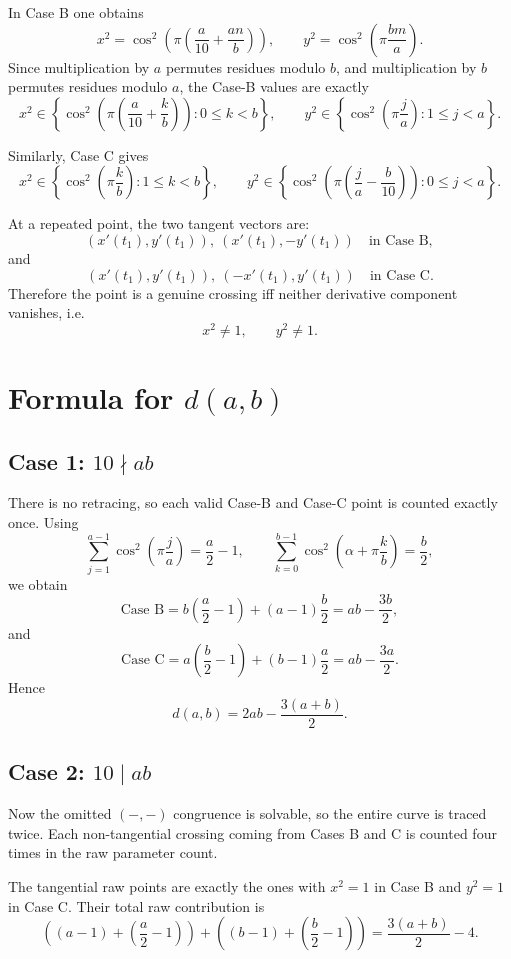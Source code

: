 \documentclass[11pt]{article}
\begin{document}
In Case B one obtains
\[
x^2=\cos^2\!\left(\pi\left(\frac{a}{10}+\frac{an}{b}\right)\right),
\qquad
y^2=\cos^2\!\left(\pi\frac{bm}{a}\right).
\]
Since multiplication by $a$ permutes residues modulo $b$, and multiplication by $b$ permutes residues modulo $a$, the Case-B values are exactly
\[
x^2\in \left\{\cos^2\!\left(\pi\left(\frac{a}{10}+\frac{k}{b}\right)\right):0\le k<b\right\},
\qquad
y^2\in \left\{\cos^2\!\left(\pi\frac{j}{a}\right):1\le j<a\right\}.
\]

Similarly, Case C gives
\[
x^2\in \left\{\cos^2\!\left(\pi\frac{k}{b}\right):1\le k<b\right\},
\qquad
y^2\in \left\{\cos^2\!\left(\pi\left(\frac{j}{a}-\frac{b}{10}\right)\right):0\le j<a\right\}.
\]

At a repeated point, the two tangent vectors are:
\[
(x'(t_1),y'(t_1)),\ (x'(t_1),-y'(t_1)) \quad\text{in Case B},
\]
and
\[
(x'(t_1),y'(t_1)),\ (-x'(t_1),y'(t_1)) \quad\text{in Case C}.
\]
Therefore the point is a genuine crossing iff neither derivative component vanishes, i.e.
\[
x^2\ne 1,\qquad y^2\ne 1.
\]

\section{Formula for \texorpdfstring{$d(a,b)$}{d(a,b)}}

\subsection*{Case 1: $10\nmid ab$}

There is no retracing, so each valid Case-B and Case-C point is counted exactly once.
Using
\[
\sum_{j=1}^{a-1}\cos^2\!\left(\pi\frac{j}{a}\right)=\frac{a}{2}-1,
\qquad
\sum_{k=0}^{b-1}\cos^2\!\left(\alpha+\pi\frac{k}{b}\right)=\frac{b}{2},
\]
we obtain
\[
\text{Case B}=b\left(\frac{a}{2}-1\right)+(a-1)\frac{b}{2}=ab-\frac{3b}{2},
\]
and
\[
\text{Case C}=a\left(\frac{b}{2}-1\right)+(b-1)\frac{a}{2}=ab-\frac{3a}{2}.
\]
Hence
\[
d(a,b)=2ab-\frac{3(a+b)}{2}.
\]

\subsection*{Case 2: $10\mid ab$}

Now the omitted $(-,-)$ congruence is solvable, so the entire curve is traced twice. Each non-tangential crossing coming from Cases B and C is counted four times in the raw parameter count.

The tangential raw points are exactly the ones with $x^2=1$ in Case B and $y^2=1$ in Case C. Their total raw contribution is
\[
\left((a-1)+\left(\frac{a}{2}-1\right)\right)
+
\left((b-1)+\left(\frac{b}{2}-1\right)\right)
=\frac{3(a+b)}{2}-4.
\]
\end{document}
